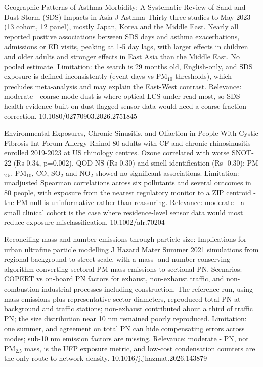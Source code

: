 \documentclass[10pt]{article}
\begin{document}
{Geographic Patterns of Asthma Morbidity: A Systematic Review of Sand and Dust Storm (SDS) Impacts in Asia}
{J Asthma}
{Thirty-three studies to May 2023 (13 cohort, 12 panel), mostly Japan, Korea and the Middle East. Nearly all reported positive associations between SDS days and asthma exacerbations, admissions or ED visits, peaking at 1-5 day lags, with larger effects in children and older adults and stronger effects in East Asia than the Middle East. No pooled estimate. Limitation: the search is 29 months old, English-only, and SDS exposure is defined inconsistently (event days vs PM$_{10}$ thresholds), which precludes meta-analysis and may explain the East-West contrast. Relevance: moderate - coarse-mode dust is where optical LCS under-read most, so SDS health evidence built on dust-flagged sensor data would need a coarse-fraction correction.}
{10.1080/02770903.2026.2751845}

{Environmental Exposures, Chronic Sinusitis, and Olfaction in People With Cystic Fibrosis}
{Int Forum Allergy Rhinol}
{80 adults with CF and chronic rhinosinusitis enrolled 2019-2023 at US rhinology centres. Ozone correlated with worse SNOT-22 (Rs 0.34, p=0.002), QOD-NS (Rs 0.30) and smell identification (Rs -0.30); PM$_{2.5}$, PM$_{10}$, CO, SO$_2$ and NO$_2$ showed no significant associations. Limitation: unadjusted Spearman correlations across six pollutants and several outcomes in 80 people, with exposure from the nearest regulatory monitor to a ZIP centroid - the PM null is uninformative rather than reassuring. Relevance: moderate - a small clinical cohort is the case where residence-level sensor data would most reduce exposure misclassification.}
{10.1002/alr.70204}

\par{}\baselineskip{}\baselineskip
{}

{Reconciling mass and number emissions through particle size: Implications for urban ultrafine particle modelling}
{J Hazard Mater}
{Summer 2021 simulations from regional background to street scale, with a mass- and number-conserving algorithm converting sectoral PM mass emissions to sectional PN. Scenarios: COPERT vs on-board PN factors for exhaust, non-exhaust traffic, and non-combustion industrial processes including construction. The reference run, using mass emissions plus representative sector diameters, reproduced total PN at background and traffic stations; non-exhaust contributed about a third of traffic PN; the size distribution near 10 nm remained poorly reproduced. Limitation: one summer, and agreement on total PN can hide compensating errors across modes; sub-10 nm emission factors are missing. Relevance: moderate - PN, not PM$_{2.5}$ mass, is the UFP exposure metric, and low-cost condensation counters are the only route to network density.}
{10.1016/j.jhazmat.2026.143879}
\end{document}
